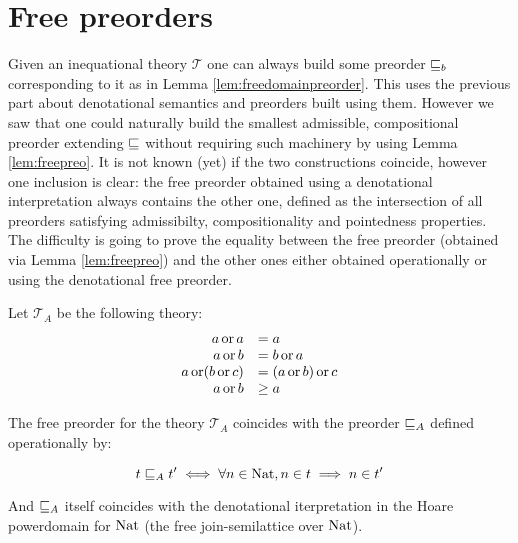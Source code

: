 
\section{Free preorders}

Given an inequational theory $\mathcal{T}$ one can always 
build some preorder $\sqsubseteq_b$ corresponding to it as in Lemma 
\ref{lem:freedomainpreorder}.
This uses the previous part about denotational semantics 
and preorders built using them. However we saw 
that one could naturally build the smallest admissible,
compositional preorder extending $\sqsubseteq$ without 
requiring such machinery by using Lemma \ref{lem:freepreo}. 
It is not known (yet) if the two constructions coincide,
however one inclusion is clear: the free preorder obtained 
using a denotational interpretation always contains 
the other one, defined as the intersection of all preorders 
satisfying admissibilty, compositionality and pointedness properties.
The difficulty is going to prove the equality between the free preorder 
(obtained via Lemma \ref{lem:freepreo}) and the other ones 
either obtained operationally or using the denotational free preorder.


\begin{alemma}
    Let $\mathcal{T}_A$ be the following theory:
    \begin{equation*}
        \begin{array}{rl}
            a \operatorname{or} a &= a \\
            a \operatorname{or} b &= b \operatorname{or} a \\
            a \operatorname{or} (b \operatorname{or} c) &= (a \operatorname{or} b) \operatorname{or} c \\
            a \operatorname{or} b &\geq a
        \end{array}
    \end{equation*}


    The free preorder for the theory 
    $\mathcal{T}_A$ coincides 
    with the preorder $\sqsubseteq_A$ defined 
    operationally by:

    \begin{equation*}
        t \sqsubseteq_A t' 
        \iff
        \forall n \in \textnormal{Nat}, n \in t \implies n \in t'
    \end{equation*}

    And $\sqsubseteq_A$ itself coincides with the denotational
    iterpretation in the Hoare powerdomain for $\textnormal{Nat}$
    (the free join-semilattice over $\textnormal{Nat}$).
\end{alemma}

